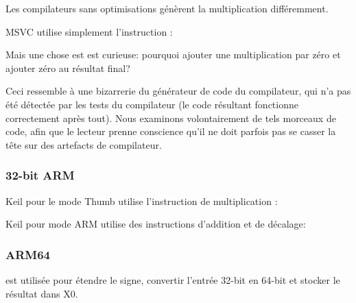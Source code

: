 Les compilateurs sans optimisations génèrent la multiplication différemment.



MSVC \NonOptimizing utilise simplement l'instruction \IMUL:



\myindex{\CompilerAnomaly}
\label{MSVC2013_anomaly}

Mais une chose est est curieuse: pourquoi ajouter une multiplication par zéro et
ajouter zéro au résultat final?

Ceci ressemble à une bizarrerie du générateur de code du compilateur, qui n'a pas
été détectée par les tests du compilateur (le code résultant fonctionne correctement
après tout).
%
Nous examinons volontairement de tels morceaux de code, afin que le lecteur prenne
conscience qu'il ne doit parfois pas se casser la tête sur des artefacts de compilateur.

\subsubsection{32-bit ARM}

Keil \Optimizing pour le mode Thumb utilise l'instruction de multiplication :



Keil \Optimizing pour mode ARM utilise des instructions d'addition et de décalage:



\subsubsection{ARM64}




 est utilisée pour étendre le signe, convertir l'entrée 32-bit en 64-bit
et stocker le résultat dans X0.

